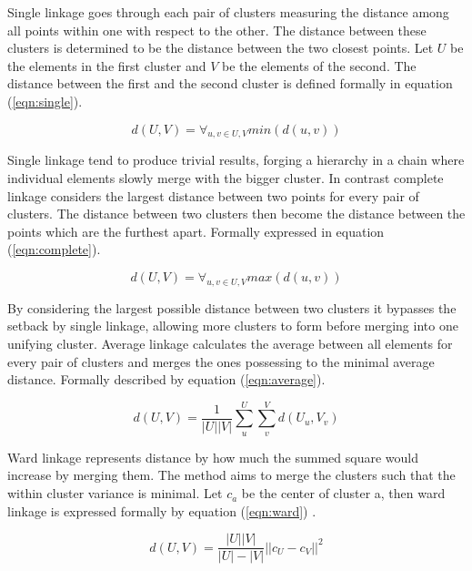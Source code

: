 Single linkage goes through each pair of clusters measuring the distance among all points within one with respect to the other. The distance between these clusters is determined to be the distance between the two closest points. Let $U$ be the elements in the first cluster and $V$ be the elements of the second. The distance between the first and the second cluster is defined formally in equation (\ref{eqn:single}).

\begin{equation}
\label{eqn:single}
d(U, V) = \forall_{u, v \in U, V} min(d(u, v))
\end{equation}

Single linkage tend to produce trivial results, forging a hierarchy in a chain where individual elements slowly merge with the bigger cluster. In contrast complete linkage considers the largest distance between two points for every pair of clusters. The distance between two clusters then become the distance between the points which are the furthest apart. Formally expressed in equation (\ref{eqn:complete}).

\begin{equation}
\label{eqn:complete}
d(U, V) = \forall_{u, v \in U, V} max(d(u, v))
\end{equation}

By considering the largest possible distance between two clusters it bypasses the setback by single linkage, allowing more clusters to form before merging into one unifying cluster. Average linkage calculates the average between all elements for every pair of clusters and merges the ones possessing to the minimal average distance. Formally described by equation (\ref{eqn:average}).

\begin{equation}
\label{eqn:average}
d(U, V) = \frac{1}{|U||V|}\sum\limits_u^U \sum\limits_v^V  d(U_u, V_v)
\end{equation}

Ward linkage represents distance by how much the summed square would increase by merging them. The method aims to merge the clusters such that the within cluster variance is minimal. Let $c_a$ be the center of cluster a, then ward linkage is expressed formally by equation (\ref{eqn:ward}) \cite{shalizi2009distances}.


\begin{equation}
\label{eqn:ward}
d(U, V) = \frac{|U||V|}{|U|-|V|}||c_U - c_V||^2
\end{equation}



